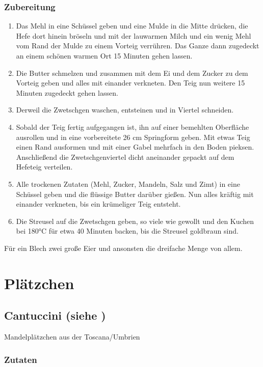 \subsection*{Zubereitung}
\begin{enumerate}
	\item Das Mehl in eine Schüssel geben und eine Mulde in die Mitte drücken, die Hefe dort hinein bröseln und mit der lauwarmen Milch und ein wenig Mehl vom Rand der Mulde zu einem Vorteig verrühren. Das Ganze dann zugedeckt an einem schönen warmen Ort 15 Minuten gehen lassen.
	\item Die Butter schmelzen und zusammen mit dem Ei und dem Zucker zu dem Vorteig geben und alles mit einander verkneten. Den Teig nun weitere 15 Minuten zugedeckt gehen lassen.
	\item Derweil die Zwetschgen waschen, entsteinen und in Viertel schneiden.
	\item Sobald der Teig fertig aufgegangen ist, ihn auf einer bemehlten Oberfläche ausrollen und in eine vorbereitete 26 cm Springform geben. Mit etwas Teig einen Rand ausformen und mit einer Gabel mehrfach in den Boden pieksen. Anschließend die Zwetschgenviertel dicht aneinander gepackt auf dem Hefeteig verteilen.
	\item Alle trockenen Zutaten (Mehl, Zucker, Mandeln, Salz und Zimt) in eine Schüssel geben und die flüssige Butter darüber gießen. Nun alles kräftig mit einander verkneten, bis ein krümeliger Teig entsteht.
	\item Die Streusel auf die Zwetschgen geben, so viele wie gewollt und den Kuchen bei 180°C für etwa 40 Minuten backen, bis die Streusel goldbraun sind.
\end{enumerate}

Für ein Blech zwei große Eier und ansonsten die dreifache Menge von allem.



\chapter{Plätzchen}

\section[Cantuccini]{Cantuccini \textmd{(siehe \cite{ChefkochCantuccini})}}
Mandelplätzchen aus der Toscana/Umbrien
\subsection*{Zutaten}

